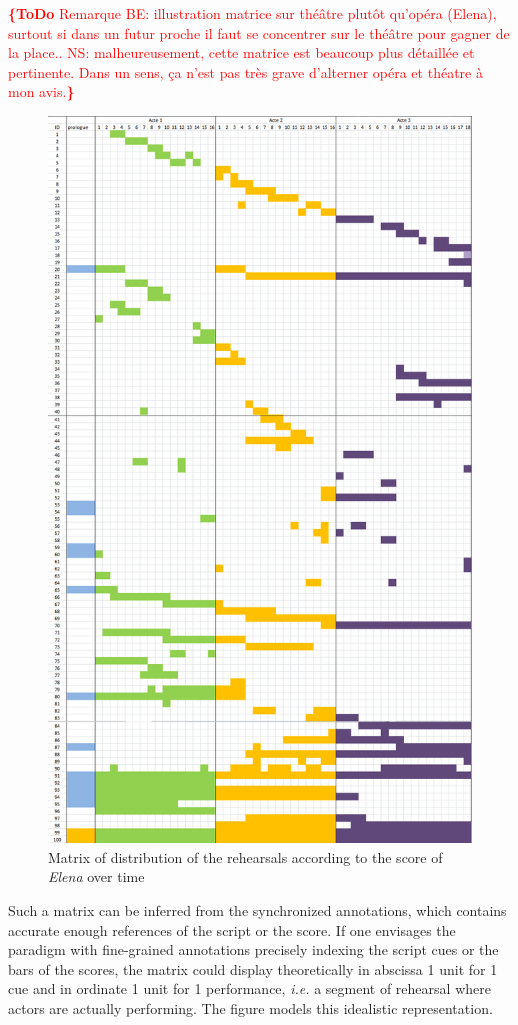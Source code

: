 \documentclass[conference]{IEEEtran}
\newcommand{\todo}[1]{\noindent\textcolor{red}{{\bf \{ToDo} #1{\bf \}}}}
\begin{document}
\todo{Remarque BE: illustration matrice sur théâtre plutôt qu'opéra (Elena), surtout si dans un futur proche il faut se concentrer sur le théâtre pour gagner de la place.. 
NS: malheureusement, cette matrice est beaucoup plus détaillée et pertinente. Dans un sens, ça n'est pas très grave d'alterner opéra et théatre à mon avis.}
\begin{figure}[htb!]
  \centering
  \includegraphics[width=0.60\columnwidth]{elenamatrix}
  \caption{Matrix of distribution of the rehearsals according to the score of \emph{Elena} over time}
  \label{fig:elenamatrix}
\end{figure}

Such a matrix can be inferred from the synchronized annotations, which contains accurate enough references of the script or the score. 
If one envisages the paradigm with fine-grained annotations precisely indexing the script cues or the bars of the scores, the matrix could display theoretically in abscissa 1 unit for 1 cue and in ordinate 1 unit for 1 performance, {\it i.e.} a segment of rehearsal where actors are actually performing. The figure models this idealistic representation.
\end{document}
